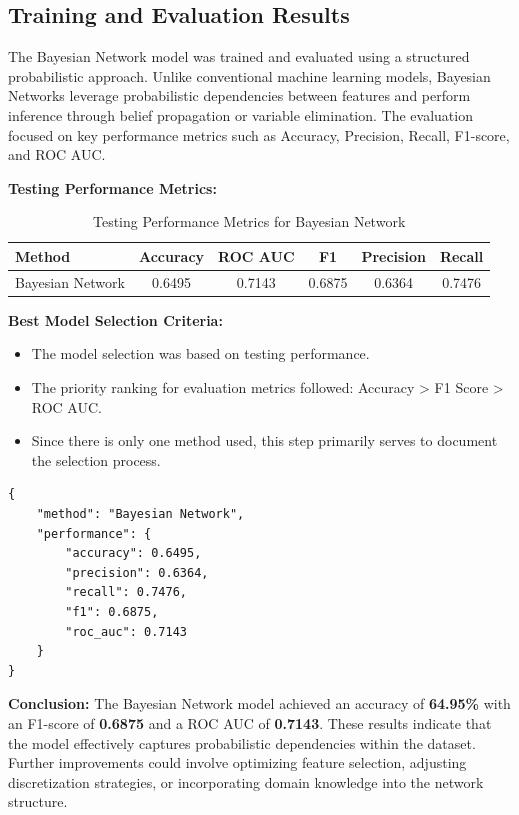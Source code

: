 \subsection{Training and Evaluation Results}

The Bayesian Network model was trained and evaluated using a structured probabilistic approach. Unlike conventional machine learning models, Bayesian Networks leverage probabilistic dependencies between features and perform inference through belief propagation or variable elimination. The evaluation focused on key performance metrics such as Accuracy, Precision, Recall, F1-score, and ROC AUC.

\textbf{Testing Performance Metrics:}

\begin{table}[H]
    \centering
    \caption{Testing Performance Metrics for Bayesian Network}
    \label{tab:bayesnet-testing-metrics}
    \begin{tabular}{|l|c|c|c|c|c|}
        \hline
        \textbf{Method} & \textbf{Accuracy} & \textbf{ROC AUC} & \textbf{F1} & \textbf{Precision} & \textbf{Recall} \\ 
        \hline
        Bayesian Network & 0.6495 & 0.7143 & 0.6875 & 0.6364 & 0.7476 \\ 
        \hline
    \end{tabular}
\end{table}

\textbf{Best Model Selection Criteria:}

\begin{itemize}
    \item The model selection was based on testing performance.
    \item The priority ranking for evaluation metrics followed: Accuracy > F1 Score > ROC AUC.
    \item Since there is only one method used, this step primarily serves to document the selection process.
\end{itemize}

\begin{verbatim}
{
    "method": "Bayesian Network",
    "performance": {
        "accuracy": 0.6495,
        "precision": 0.6364,
        "recall": 0.7476,
        "f1": 0.6875,
        "roc_auc": 0.7143
    }
}
\end{verbatim}

\textbf{Conclusion:}  
The Bayesian Network model achieved an accuracy of \textbf{64.95\%} with an F1-score of \textbf{0.6875} and a ROC AUC of \textbf{0.7143}. These results indicate that the model effectively captures probabilistic dependencies within the dataset. Further improvements could involve optimizing feature selection, adjusting discretization strategies, or incorporating domain knowledge into the network structure.

